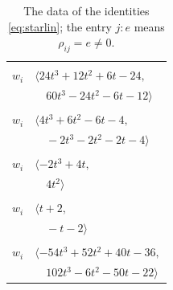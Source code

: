 \documentclass[11pt]{article}
\begin{document}
\begingroup\scriptsize
\setlength{\LTcapwidth}{\textwidth}
\begin{longtable}{@{}ll@{}}
\caption{The data of the identities \eqref{eq:starlin}; the entry $j{:}e$ means $\rho_{ij}=e\neq0$.}\label{tab:star}\\
\hline\endfirsthead\hline\endhead\hline\endfoot
\multicolumn{2}{@{}p{0.97\textwidth}@{}}{$i=0$, $D_i=4$, $\rho_{ij}$: $7{:}3, \allowbreak 10{:}1, \allowbreak 12{:}3, \allowbreak 13{:}3, \allowbreak 14{:}3, \allowbreak 15{:}3, \allowbreak 16{:}1, \allowbreak 24{:}3, \allowbreak 29{:}3, \allowbreak 40{:}3, \allowbreak 41{:}2$}\\
$w_i$ & $\langle 24t^{3}+12t^{2}+6t-24,$\\
 & $\quad 60t^{3}-24t^{2}-6t-12\rangle$\\
\addlinespace[2pt]
\multicolumn{2}{@{}p{0.97\textwidth}@{}}{$i=1$, $D_i=1$, $\rho_{ij}$: $5{:}2, \allowbreak 6{:}1, \allowbreak 7{:}1, \allowbreak 11{:}1, \allowbreak 12{:}2, \allowbreak 14{:}1, \allowbreak 15{:}1, \allowbreak 22{:}2, \allowbreak 24{:}1, \allowbreak 34{:}2, \allowbreak 38{:}2, \allowbreak 39{:}3, \allowbreak 40{:}1, \allowbreak 41{:}3$}\\
$w_i$ & $\langle 4t^{3}+6t^{2}-6t-4,$\\
 & $\quad -2t^{3}-2t^{2}-2t-4\rangle$\\
\addlinespace[2pt]
\multicolumn{2}{@{}p{0.97\textwidth}@{}}{$i=2$, $D_i=2$, $\rho_{ij}$: $4{:}1, \allowbreak 5{:}2, \allowbreak 7{:}1, \allowbreak 11{:}1, \allowbreak 22{:}1, \allowbreak 23{:}1, \allowbreak 27{:}1, \allowbreak 32{:}2, \allowbreak 33{:}1, \allowbreak 34{:}3$}\\
$w_i$ & $\langle -2t^{3}+4t,$\\
 & $\quad 4t^{2}\rangle$\\
\addlinespace[2pt]
\multicolumn{2}{@{}p{0.97\textwidth}@{}}{$i=3$, $D_i=2$, $\rho_{ij}$: $27{:}3, \allowbreak 28{:}2, \allowbreak 29{:}3, \allowbreak 32{:}3, \allowbreak 33{:}1, \allowbreak 37{:}1$}\\
$w_i$ & $\langle t+2,$\\
 & $\quad -t-2\rangle$\\
\addlinespace[2pt]
\multicolumn{2}{@{}p{0.97\textwidth}@{}}{$i=4$, $D_i=4$, $\rho_{ij}$: $2{:}3, \allowbreak 8{:}1, \allowbreak 10{:}2, \allowbreak 12{:}3, \allowbreak 17{:}2, \allowbreak 21{:}1, \allowbreak 29{:}2, \allowbreak 32{:}1, \allowbreak 37{:}3$}\\
$w_i$ & $\langle -54t^{3}+52t^{2}+40t-36,$\\
 & $\quad 102t^{3}-6t^{2}-50t-22\rangle$\\

\end{longtable}
\end{document}
